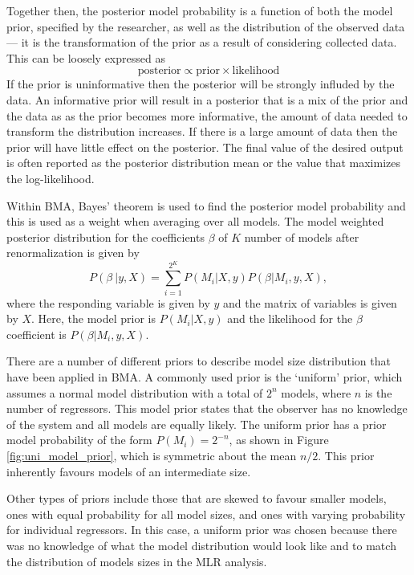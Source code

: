 \documentclass[12pt]{article}
\begin{document}
Together then, the posterior model probability is a function of both the model prior, specified by the researcher, as well as the distribution of the observed data --- it is the transformation of the prior as a result of considering collected data. This can be loosely expressed as
\begin{equation}
\textrm{posterior} \propto \textrm{prior} \times \textrm{likelihood}
\end{equation}
If the prior is uninformative then the posterior will be strongly influded by the data. An informative prior will result in a posterior that is a mix of the prior and the data as as the prior becomes more informative, the amount of data needed to transform the distribution increases. If there is a large amount of data then the prior will have little effect on the posterior. The final value of the desired output is often reported as the posterior distribution mean or the value that maximizes the log-likelihood. 

Within BMA, Bayes' theorem is used to find the posterior model probability and this is used as a weight when averaging over all models. The model weighted posterior distribution for the coefficients $\beta$ of $K$ number of models after renormalization is given by \citep{Raftery1997}
\begin{equation}
P(\beta\ | y,X) = \sum\limits_{i=1}^{2^K} P(M_i | X,y)P(\beta | M_i , y, X),
\end{equation}
where the responding variable is given by $y$ and the matrix of variables is given by $X$. Here, the model prior is $P(M_i | X,y)$ and the likelihood for the $\beta$ coefficient is $P(\beta | M_i , y, X)$.

There are a number of different priors to describe model size distribution that have been applied in BMA. A commonly used prior is the `uniform' prior, which assumes a normal model distribution with a total of $2^n$ models, where $n$ is the number of regressors.  This model prior states that the observer has no knowledge of the system and all models are equally likely. The uniform prior has a prior model probability of the form $P(M_i)=2^{-n}$, as shown in Figure \ref{fig:uni_model_prior}, which is symmetric about the mean $n/2$. This prior inherently favours models of an intermediate size. 

Other types of priors include those that are skewed to favour smaller models, ones with equal probability for all model sizes, and ones with varying probability for individual regressors. In this case, a uniform prior was chosen because there was no knowledge of what the model distribution would look like and to match the distribution of models sizes in the MLR analysis. 
\end{document}
